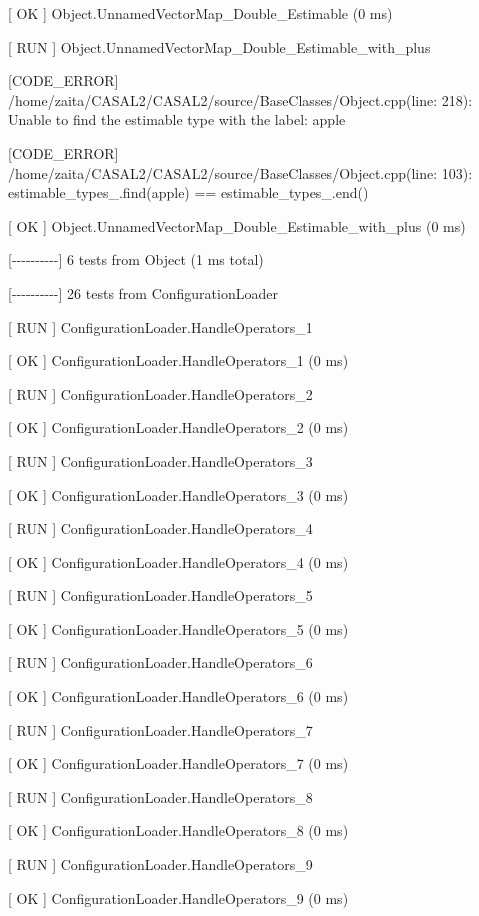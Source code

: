 \documentclass[a4paper,11pt,twoside,pdftex,draft]{article}
\begin{document}
{[} OK {]} Object.UnnamedVectorMap\_Double\_Estimable (0 ms)

{[} RUN {]} Object.UnnamedVectorMap\_Double\_Estimable\_with\_plus

{[}CODE\_ERROR{]}
/home/zaita/CASAL2/CASAL2/source/BaseClasses/Object.cpp(line: 218):
Unable to find the estimable type with the label: apple

{[}CODE\_ERROR{]}
/home/zaita/CASAL2/CASAL2/source/BaseClasses/Object.cpp(line: 103):
estimable\_types\_.find(apple) == estimable\_types\_.end()

{[} OK {]} Object.UnnamedVectorMap\_Double\_Estimable\_with\_plus (0 ms)

{[}-\/-\/-\/-\/-\/-\/-\/-\/-\/-{]} 6 tests from Object (1 ms total)

{[}-\/-\/-\/-\/-\/-\/-\/-\/-\/-{]} 26 tests from ConfigurationLoader

{[} RUN {]} ConfigurationLoader.HandleOperators\_1

{[} OK {]} ConfigurationLoader.HandleOperators\_1 (0 ms)

{[} RUN {]} ConfigurationLoader.HandleOperators\_2

{[} OK {]} ConfigurationLoader.HandleOperators\_2 (0 ms)

{[} RUN {]} ConfigurationLoader.HandleOperators\_3

{[} OK {]} ConfigurationLoader.HandleOperators\_3 (0 ms)

{[} RUN {]} ConfigurationLoader.HandleOperators\_4

{[} OK {]} ConfigurationLoader.HandleOperators\_4 (0 ms)

{[} RUN {]} ConfigurationLoader.HandleOperators\_5

{[} OK {]} ConfigurationLoader.HandleOperators\_5 (0 ms)

{[} RUN {]} ConfigurationLoader.HandleOperators\_6

{[} OK {]} ConfigurationLoader.HandleOperators\_6 (0 ms)

{[} RUN {]} ConfigurationLoader.HandleOperators\_7

{[} OK {]} ConfigurationLoader.HandleOperators\_7 (0 ms)

{[} RUN {]} ConfigurationLoader.HandleOperators\_8

{[} OK {]} ConfigurationLoader.HandleOperators\_8 (0 ms)

{[} RUN {]} ConfigurationLoader.HandleOperators\_9

{[} OK {]} ConfigurationLoader.HandleOperators\_9 (0 ms)
\end{document}
